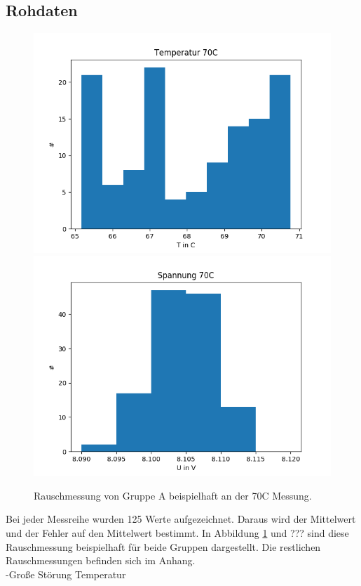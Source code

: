\documentclass[12pt,a4paper]{article}
\begin{document}
\subsection{Rohdaten}
\begin{figure}
\includegraphics[scale=0.5]{Bilder/Rauschmessung_A_Temp.png}
\includegraphics[scale=0.5]{Bilder/Rauschmessung_A_Spannung.png}
\caption{Rauschmessung von Gruppe A beispielhaft an der 70C Messung.}
\label{fig:Rausch_A}
\end{figure}

Bei jeder Messreihe wurden 125 Werte aufgezeichnet. Daraus wird der Mittelwert und der Fehler auf den Mittelwert bestimmt. In Abbildung \ref{fig:Rausch_A} und ??? sind diese Rauschmessung beispielhaft für beide Gruppen dargestellt. Die restlichen Rauschmessungen befinden sich im Anhang.\\
-Große Störung Temperatur\\
\end{document}
